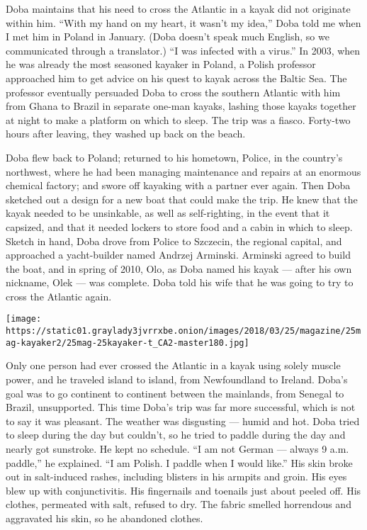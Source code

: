 Doba maintains that his need to cross the Atlantic in a kayak did not
originate within him. ``With my hand on my heart, it wasn't my idea,''
Doba told me when I met him in Poland in January. (Doba doesn't speak
much English, so we communicated through a translator.) ``I was infected
with a virus.'' In 2003, when he was already the most seasoned kayaker
in Poland, a Polish professor approached him to get advice on his quest
to kayak across the Baltic Sea. The professor eventually persuaded Doba
to cross the southern Atlantic with him from Ghana to Brazil in separate
one-man kayaks, lashing those kayaks together at night to make a
platform on which to sleep. The trip was a fiasco. Forty-two hours after
leaving, they washed up back on the beach.

Doba flew back to Poland; returned to his hometown, Police, in the
country's northwest, where he had been managing maintenance and repairs
at an enormous chemical factory; and swore off kayaking with a partner
ever again. Then Doba sketched out a design for a new boat that could
make the trip. He knew that the kayak needed to be unsinkable, as well
as self-righting, in the event that it capsized, and that it needed
lockers to store food and a cabin in which to sleep. Sketch in hand,
Doba drove from Police to Szczecin, the regional capital, and approached
a yacht-builder named Andrzej Arminski. Arminski agreed to build the
boat, and in spring of 2010, Olo, as Doba named his kayak --- after his
own nickname, Olek --- was complete. Doba told his wife that he was
going to try to cross the Atlantic again.

\texttt{[image: https://static01.graylady3jvrrxbe.onion/images/2018/03/25/magazine/25mag-kayaker2/25mag-25kayaker-t\_CA2-master180.jpg]}

Only one person had ever crossed the Atlantic in a kayak using solely
muscle power, and he traveled island to island, from Newfoundland to
Ireland. Doba's goal was to go continent to continent between the
mainlands, from Senegal to Brazil, unsupported. This time Doba's trip
was far more successful, which is not to say it was pleasant. The
weather was disgusting --- humid and hot. Doba tried to sleep during the
day but couldn't, so he tried to paddle during the day and nearly got
sunstroke. He kept no schedule. ``I am not German --- always 9 a.m.
paddle,'' he explained. ``I am Polish. I paddle when I would like.'' His
skin broke out in salt-induced rashes, including blisters in his armpits
and groin. His eyes blew up with conjunctivitis. His fingernails and
toenails just about peeled off. His clothes, permeated with salt,
refused to dry. The fabric smelled horrendous and aggravated his skin,
so he abandoned clothes.

